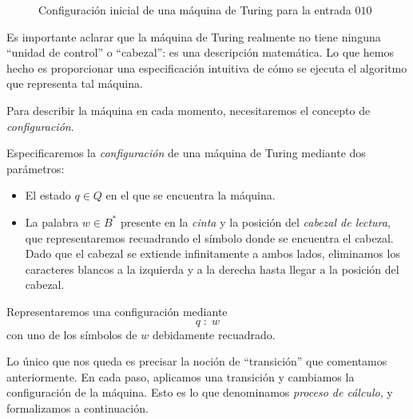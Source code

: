 \begin{figure}[H]
\centering
\vspace{8pt}

\caption{Configuración inicial de una máquina de Turing para la entrada $010$}
\label{fig:maquina-turing}
\end{figure}

Es importante aclarar que la máquina de Turing realmente no tiene ninguna ``unidad de control'' o ``cabezal'': es una descripción matemática. Lo que hemos hecho es proporcionar una especificación intuitiva de cómo se ejecuta el algoritmo que representa tal máquina.

Para describir la máquina en cada momento, necesitaremos el concepto de \emph{configuración}.

\begin{definicion}\label{def:configuracion-maquina-turing}
Especificaremos la \emph{configuración} de una máquina de Turing mediante dos parámetros:

\begin{itemize}
    \item El estado $q\in Q$ en el que se encuentra la máquina.
    \item La palabra $w \in B^*$ presente en la \emph{cinta} y la posición del \emph{cabezal de lectura}, que representaremos recuadrando el símbolo donde se encuentra el cabezal. Dado que el cabezal se extiende infinitamente a ambos lados, eliminamos los caracteres blancos a la izquierda y a la derecha hasta llegar a la posición del cabezal.
\end{itemize}

Representaremos una configuración mediante $$q\;:\;w$$ con uno de los símbolos de $w$ debidamente recuadrado.
\end{definicion}

Lo único que nos queda es precisar la noción de ``transición'' que comentamos anteriormente. En cada paso, aplicamos una transición y cambiamos la configuración de la máquina. Esto es lo que denominamos \emph{proceso de cálculo}, y formalizamos a continuación.

